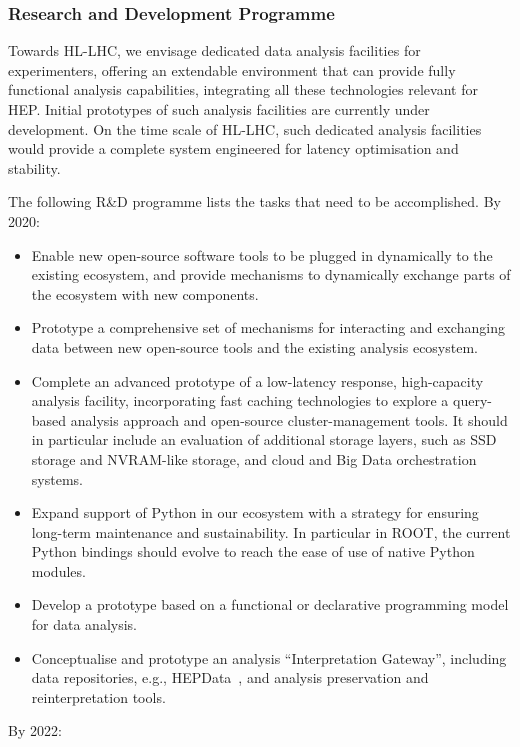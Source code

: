 \subsubsection*{Research and Development Programme}

Towards HL-LHC, we envisage dedicated data analysis facilities for
experimenters, offering an extendable environment that can provide fully
functional analysis capabilities, integrating all these technologies
relevant for HEP. Initial prototypes of such analysis facilities are
currently under development. On the time scale of HL-LHC, such dedicated
analysis facilities would provide a complete system engineered for
latency optimisation and stability.

The following R\&D programme lists the tasks that need to be
accomplished. By 2020:

\begin{itemize}
\item
  Enable new open-source software tools to be plugged in dynamically to
  the existing ecosystem, and provide mechanisms to dynamically exchange
  parts of the ecosystem with new components.
  \item
    Prototype a comprehensive set of mechanisms for interacting and
    exchanging data between new open-source tools and the existing
    analysis ecosystem.
\item
  Complete an advanced prototype of a low-latency response,
  high-capacity analysis facility, incorporating fast caching
  technologies to explore a query-based analysis approach and
  open-source cluster-management tools. It should in particular include
  an evaluation of additional storage layers, such as SSD storage and
  NVRAM-like storage, and cloud and Big Data orchestration systems.
\item
  Expand support of Python in our ecosystem with a strategy for ensuring
  long-term maintenance and sustainability. In particular in ROOT, the
  current Python bindings should evolve to reach the ease of use of native Python modules.
\item
  Develop a prototype based on a functional or declarative programming
  model for data analysis.
\item
  Conceptualise and prototype an analysis ``Interpretation Gateway'',
  including data repositories, e.g., HEPData~\cite{HEPData,HEPDataRepo}, and
  analysis preservation and reinterpretation tools.
\end{itemize}

By 2022:

